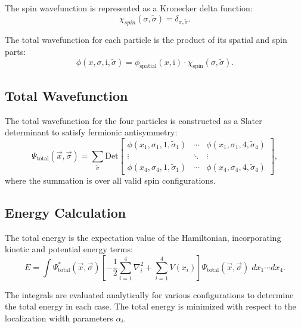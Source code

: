 \documentclass[11pt]{article}
\begin{document}
The spin wavefunction is represented as a Kronecker delta function:
\begin{equation}
\chi_{spin}(\sigma, \tilde{\sigma}) = \delta_{\sigma, \tilde{\sigma}}.
\end{equation}

The total wavefunction for each particle is the product of its spatial and spin parts:
\begin{equation}
\phi(x, \sigma, \text{i}, \tilde{\sigma}) = \phi_\text{spatial}(x, \text{i}) \cdot \chi_\text{spin}(\sigma, \tilde{\sigma}).
\end{equation}

\subsection{Total Wavefunction}

The total wavefunction for the four particles is constructed as a Slater determinant to satisfy fermionic antisymmetry:
\begin{equation}
\Psi_\text{total}(\vec{x}, \vec{\sigma}) = \sum_{\tilde{\sigma}} \text{Det}
\begin{bmatrix}
\phi(x_1, \sigma_1, 1, \tilde{\sigma}_1) & \cdots & \phi(x_1, \sigma_1, 4, \tilde{\sigma}_4) \\
\vdots & \ddots & \vdots \\
\phi(x_4, \sigma_4, 1, \tilde{\sigma}_1) & \cdots & \phi(x_4, \sigma_4, 4, \tilde{\sigma}_4)
\end{bmatrix},
\end{equation}
where the summation is over all valid spin configurations.

\subsection{Energy Calculation}

The total energy is the expectation value of the Hamiltonian, incorporating kinetic and potential energy terms:
\begin{equation}
E = \int \Psi_\text{total}^*(\vec{x}, \vec{\sigma}) \left[ -\frac{1}{2} \sum_{i=1}^4 \nabla_i^2 + \sum_{i=1}^4 V(x_i) \right] \Psi_\text{total}(\vec{x}, \vec{\sigma}) \; dx_1 \cdots dx_4.
\end{equation}

The integrals are evaluated analytically for various configurations to determine the total energy in each case. The total energy is minimized with respect to the localization width parameters \(\alpha_i\).
\end{document}
